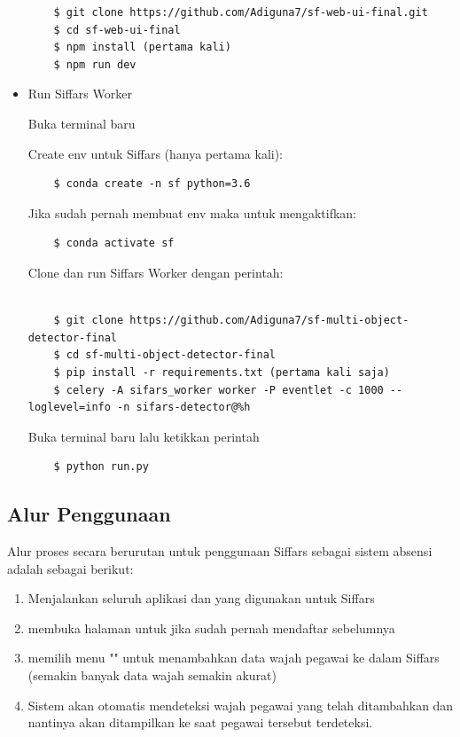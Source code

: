 \begin{itemize}
\begin{lstlisting}
    $ git clone https://github.com/Adiguna7/sf-web-ui-final.git
    $ cd sf-web-ui-final
    $ npm install (pertama kali)
    $ npm run dev
  \end{lstlisting}

  \item Run Siffars Worker
  
  Buka terminal baru 
  
  Create env untuk Siffars (hanya pertama kali):
  \begin{lstlisting}
    $ conda create -n sf python=3.6
  \end{lstlisting}
  Jika sudah pernah membuat env maka untuk mengaktifkan:
  \begin{lstlisting}
    $ conda activate sf
  \end{lstlisting}
  Clone dan run Siffars Worker dengan perintah:
  \begin{lstlisting}

    $ git clone https://github.com/Adiguna7/sf-multi-object-detector-final
    $ cd sf-multi-object-detector-final
    $ pip install -r requirements.txt (pertama kali saja)
    $ celery -A sifars_worker worker -P eventlet -c 1000 --loglevel=info -n sifars-detector@%h
  \end{lstlisting}

  Buka terminal baru lalu ketikkan perintah

  \begin{lstlisting}
    $ python run.py
  \end{lstlisting}

\end{itemize}

\subsection{Alur Penggunaan}
Alur proses secara berurutan untuk penggunaan Siffars sebagai sistem absensi adalah sebagai berikut:
\begin{enumerate}
\item Menjalankan seluruh aplikasi dan  yang digunakan untuk Siffars
\item {} membuka halaman  untuk  jika sudah pernah mendaftar sebelumnya
\item {} memilih menu "" untuk menambahkan data wajah pegawai ke dalam  Siffars (semakin banyak data wajah semakin akurat)
\item Sistem akan otomatis mendeteksi wajah pegawai yang telah ditambahkan
dan nantinya akan ditampilkan ke  saat pegawai tersebut terdeteksi.
\end{enumerate}

